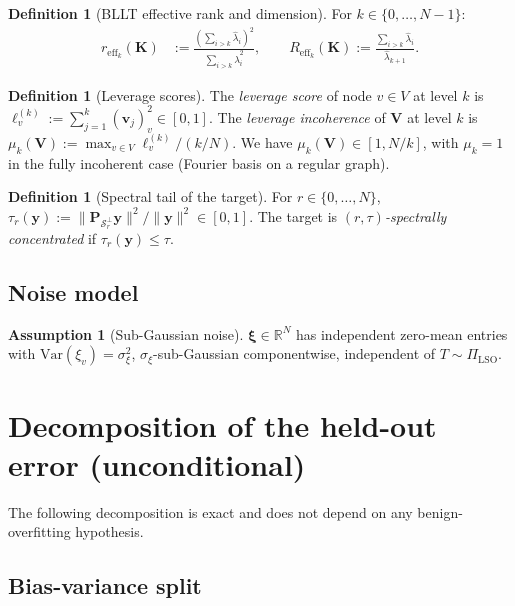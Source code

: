 \documentclass[11pt,a4paper]{article}
\theoremstyle{plain}
\theoremstyle{definition}
\newtheorem{definition}[theorem]{Definition}
\newtheorem{assumption}[theorem]{Assumption}
\theoremstyle{remark}
\newcommand{\by}{\mathbf{y}}
\newcommand{\bxi}{\boldsymbol{\xi}}
\newcommand{\bP}{\mathbf{P}}
\newcommand{\bK}{\mathbf{K}}
\newcommand{\bV}{\mathbf{V}}
\newcommand{\bv}{\mathbf{v}}
\newcommand{\R}{\mathbb{R}}
\newcommand{\Var}{\mathrm{Var}}
\newcommand{\Scal}{\mathcal{S}}
\newcommand{\reff}{r_{\mathrm{eff}}}
\newcommand{\Reff}{R_{\mathrm{eff}}}
\begin{document}
\begin{definition}[BLLT effective rank and dimension]
\label{def:eff-rank}
For $k \in \{0, \ldots, N-1\}$:
\begin{align}
    \reff_k(\bK) &:= \tfrac{(\sum_{i>k} \hat\lambda_i)^2}{\sum_{i>k} \hat\lambda_i^2},
    \qquad
    \Reff_k(\bK) := \tfrac{\sum_{i>k} \hat\lambda_i}{\hat\lambda_{k+1}}.
    \label{eq:eff-rank}
\end{align}
\end{definition}

\begin{definition}[Leverage scores]
\label{def:leverage}
The \emph{leverage score} of node $v \in V$ at level $k$ is
$\ell^{(k)}_v := \sum_{j=1}^k (\bv_j)_v^2 \in [0, 1]$. The
\emph{leverage incoherence} of $\bV$ at level $k$ is
$\mu_k(\bV) := \max_{v \in V} \ell^{(k)}_v / (k/N)$. We have
$\mu_k(\bV) \in [1, N/k]$, with $\mu_k = 1$ in the fully
incoherent case (Fourier basis on a regular graph).
\end{definition}

\begin{definition}[Spectral tail of the target]
\label{def:spec-tail-y}
For $r \in \{0, \ldots, N\}$,
$\tau_r(\by) := \|\bP_{\Scal_r^\perp}\by\|^2/\|\by\|^2 \in [0, 1]$.
The target is \emph{$(r, \tau)$-spectrally concentrated} if
$\tau_r(\by) \le \tau$.
\end{definition}

\subsection{Noise model}

\begin{assumption}[Sub-Gaussian noise]
\label{a:noise-bllt}
$\bxi \in \R^N$ has independent zero-mean entries with
$\Var(\xi_v) = \sigma_\xi^2$, $\sigma_\xi$-sub-Gaussian
componentwise, independent of $T \sim \Pi_{\mathrm{LSO}}$.
\end{assumption}

\section{Decomposition of the held-out error (unconditional)}
\label{sec:decomp}

The following decomposition is exact and does not depend on any
benign-overfitting hypothesis.

\subsection{Bias-variance split}
\end{document}
